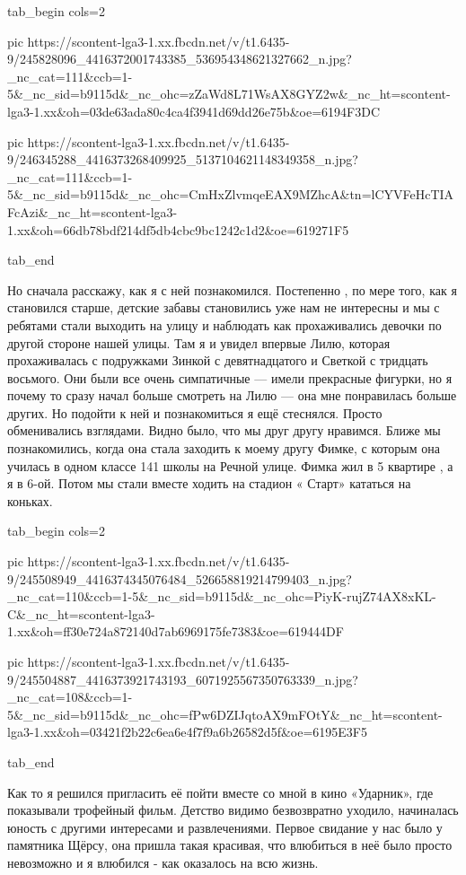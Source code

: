 \ifcmt
  tab_begin cols=2

     pic https://scontent-lga3-1.xx.fbcdn.net/v/t1.6435-9/245828096_4416372001743385_536954348621327662_n.jpg?_nc_cat=111&ccb=1-5&_nc_sid=b9115d&_nc_ohc=zZaWd8L71WsAX8GYZ2w&_nc_ht=scontent-lga3-1.xx&oh=03de63ada80c4ca4f3941d69dd26e75b&oe=6194F3DC

     pic https://scontent-lga3-1.xx.fbcdn.net/v/t1.6435-9/246345288_4416373268409925_5137104621148349358_n.jpg?_nc_cat=111&ccb=1-5&_nc_sid=b9115d&_nc_ohc=CmHxZlvmqeEAX9MZhcA&tn=lCYVFeHcTIAFcAzi&_nc_ht=scontent-lga3-1.xx&oh=66db78bdf214df5db4cbc9bc1242c1d2&oe=619271F5

  tab_end
\fi

Но сначала расскажу, как я с ней познакомился. Постепенно , по мере того, как я
становился  старше, детские забавы становились уже нам не интересны и мы с
ребятами стали выходить на улицу и наблюдать как  прохаживались девочки по
другой стороне нашей улицы. Там я и увидел впервые Лилю, которая прохаживалась
с подружками Зинкой с девятнадцатого  и Светкой с  тридцать восьмого. Они были
все очень симпатичные — имели прекрасные фигурки, но  я почему то сразу начал
больше смотреть на Лилю — она мне понравилась  больше других. Но подойти к ней
и познакомиться я  ещё стеснялся. Просто обменивались взглядами. Видно было,
что мы друг другу нравимся.  Ближе мы познакомились, когда она стала заходить к
моему другу  Фимке, с которым она училась в одном классе 141 школы на Речной
улице. Фимка жил в 5 квартире , а я в 6-ой.   Потом мы стали вместе ходить на
стадион « Старт» кататься на коньках. 


\ifcmt
  tab_begin cols=2

     pic https://scontent-lga3-1.xx.fbcdn.net/v/t1.6435-9/245508949_4416374345076484_526658819214799403_n.jpg?_nc_cat=110&ccb=1-5&_nc_sid=b9115d&_nc_ohc=PiyK-rujZ74AX8xKL-C&_nc_ht=scontent-lga3-1.xx&oh=ff30e724a872140d7ab6969175fe7383&oe=619444DF

     pic https://scontent-lga3-1.xx.fbcdn.net/v/t1.6435-9/245504887_4416373921743193_6071925567350763339_n.jpg?_nc_cat=108&ccb=1-5&_nc_sid=b9115d&_nc_ohc=fPw6DZIJqtoAX9mFOtY&_nc_ht=scontent-lga3-1.xx&oh=03421f2b22c6ea6e4f7f9a6b26582d5f&oe=6195E3F5

  tab_end
\fi

Как то я решился пригласить её пойти вместе со мной в кино «Ударник», где
показывали трофейный фильм.  Детство видимо безвозвратно уходило, начиналась
юность с другими интересами и развлечениями. Первое свидание у нас было у
памятника Щёрсу, она пришла такая красивая, что влюбиться в неё было просто
невозможно и я влюбился - как оказалось на всю жизнь.

